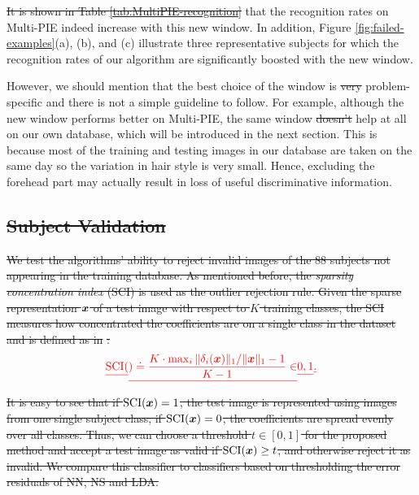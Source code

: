 \documentclass[12pt,journal,draftcls,letterpaper,onecolumn]{IEEEtran}
\providecommand{\DIFadd}[1]{{\protect\color{blue}\uwave{#1}}} %
\providecommand{\DIFdel}[1]{{\protect\color{red}\sout{#1}}}                      %
\providecommand{\DIFaddbegin}{} %
\providecommand{\DIFaddend}{} %
\providecommand{\DIFdelbegin}{} %
\providecommand{\DIFdelend}{} %
\begin{document}
\DIFdelbegin \DIFdel{It is shown in Table \ref{tab:MultiPIE-recognition} }\DIFdelend \DIFaddbegin \DIFadd{Table \ref{tab:MultiPIE-recognition} shows }\DIFaddend that the
recognition rates on Multi-PIE indeed increase with this new
window. In addition, Figure \ref{fig:failed-examples}(a), (b),
and (c) illustrate three representative subjects for which the
recognition rates of our algorithm are significantly boosted
with the new window. \DIFdelbegin %

\DIFdelend However, we should mention that the best choice of the window
is \DIFdelbegin \DIFdel{very }\DIFdelend problem-specific and there is
not a simple guideline to follow. For example, although the new
window performs better on Multi-PIE, the same window \DIFdelbegin \DIFdel{doesn't
}\DIFdelend \DIFaddbegin \DIFadd{does not
}\DIFaddend help at all on our own database, which will be introduced in
the next section. This is because most of the training and
testing images in our database are taken on the same day so the
variation in hair style is very small. Hence, excluding the
forehead part may actually result in loss of useful
discriminative information.

\DIFdelbegin \subsection{\DIFdel{Subject Validation}}
\addtocounter{subsection}{-1}%

\DIFdel{We test the algorithms' ability to reject invalid images of the
88 subjects not appearing in the training database. As
mentioned before, the \emph{sparsity concentration index} (SCI)
is used as the outlier rejection rule. Given the sparse
representation ${\boldsymbol{x}}$ of a test image with respect to $K$
training classes, the SCI measures how concentrated the
coefficients are on a single class in the dataset and is
defined as in }%
\DIFdel{:
}\begin{displaymath}%
\DIFdel{\textup{SCI}(}%
\DIFdel{) \doteq \frac{K \cdot \max_i \|\delta_i(\x)\|_1 /
\|\x\|_1 - 1}{K - 1} \in }%
\DIFdel{0,1}%
\DIFdel{.
}
\end{displaymath}%
\DIFdel{It is easy to see that if $\textup{SCI}({\boldsymbol{x}}) = 1$, the test
image is represented using images from one single subject
class; if $\textup{SCI}({\boldsymbol{x}}) = 0$, the coefficients are spread
evenly over all classes. Thus, we can choose a threshold $t \in
[0,1]$ for the proposed method and accept a test image as valid
if $\textup{SCI}({\boldsymbol{x}}) \geq t$, and otherwise reject it as
invalid. We compare this classifier to classifiers based on
thresholding the error residuals of NN, NS and LDA.
}%
\end{document}
